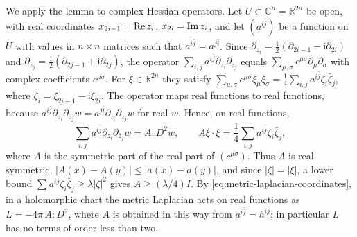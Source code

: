 We apply the lemma to complex Hessian operators. Let $U\subset\mathbb C^n=\mathbb R^{2n}$ be open, with real coordinates $x_{2i-1}=\operatorname{Re} z_i$, $x_{2i}=\operatorname{Im} z_i$, and let $(a^{i\bar j})$ be a function on $U$ with values in $n\times n$ matrices such that $\overline{a^{i\bar j}}=a^{j\bar i}$. Since $\partial_{z_i}=\frac12(\partial_{2i-1}-\mathrm i\partial_{2i})$ and $\partial_{\bar z_j}=\frac12(\partial_{2j-1}+\mathrm i\partial_{2j})$, the operator $\sum_{i,j}a^{i\bar j}\partial_{z_i}\partial_{\bar z_j}$ equals $\sum_{\mu,\sigma}c^{\mu\sigma}\partial_\mu\partial_\sigma$ with complex coefficients $c^{\mu\sigma}$. For $\xi\in\mathbb R^{2n}$ they satisfy $\sum_{\mu,\sigma}c^{\mu\sigma}\xi_\mu\xi_\sigma=\frac14\sum_{i,j}a^{i\bar j}\zeta_i\bar\zeta_j$, where $\zeta_i=\xi_{2i-1}-\mathrm i\xi_{2i}$. The operator maps real functions to real functions, because $\overline{a^{i\bar j}\partial_{z_i}\partial_{\bar z_j}w}=a^{j\bar i}\partial_{\bar z_i}\partial_{z_j}w$ for real $w$. Hence, on real functions,
\begin{equation}\label{eq:complex-hessian-real-form}
 \sum_{i,j}a^{i\bar j}\partial_{z_i}\partial_{\bar z_j}w=A:D^2w,\qquad
 A\xi\cdot\xi=\frac14\sum_{i,j}a^{i\bar j}\zeta_i\bar\zeta_j,
\end{equation}
where $A$ is the symmetric part of the real part of $(c^{\mu\sigma})$. Thus $A$ is real symmetric, $|A(x)-A(y)|\leq|a(x)-a(y)|$, and since $|\zeta|=|\xi|$, a lower bound $\sum a^{i\bar j}\zeta_i\bar\zeta_j\geq\lambda|\zeta|^2$ gives $A\geq(\lambda/4)I$. By \eqref{eq:metric-laplacian-coordinates}, in a holomorphic chart the metric Laplacian acts on real functions as $L=-4\pi\,A:D^2$, where $A$ is obtained in this way from $a^{i\bar j}=h^{i\bar j}$; in particular $L$ has no terms of order less than two.

